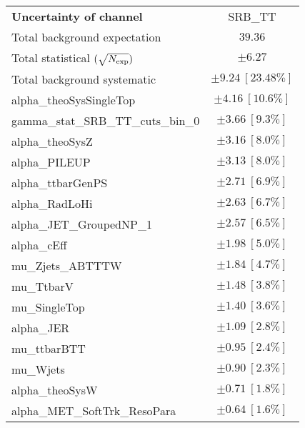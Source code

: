 
\begin{table}
\begin{center}
\setlength{\tabcolsep}{0.0pc}
\begin{tabular*}{\textwidth}{@{\extracolsep{\fill}}lc}
\noalign{\smallskip}\hline\noalign{\smallskip}
{\bf Uncertainty of channel}                                    & SRB\_TT            \\
\noalign{\smallskip}\hline\noalign{\smallskip}
Total background expectation             &  $39.36$       \\
\noalign{\smallskip}\hline\noalign{\smallskip}
Total statistical $(\sqrt{N_{\rm exp}})$              & $\pm 6.27$       \\
Total background systematic               & $\pm 9.24\ [23.48\%] $             \\
\noalign{\smallskip}\hline\noalign{\smallskip}
\noalign{\smallskip}\hline\noalign{\smallskip}
alpha\_theoSysSingleTop         & $\pm 4.16\ [10.6\%] $       \\
gamma\_stat\_SRB\_TT\_cuts\_bin\_0         & $\pm 3.66\ [9.3\%] $       \\
alpha\_theoSysZ         & $\pm 3.16\ [8.0\%] $       \\
alpha\_PILEUP         & $\pm 3.13\ [8.0\%] $       \\
alpha\_ttbarGenPS         & $\pm 2.71\ [6.9\%] $       \\
alpha\_RadLoHi         & $\pm 2.63\ [6.7\%] $       \\
alpha\_JET\_GroupedNP\_1         & $\pm 2.57\ [6.5\%] $       \\
alpha\_cEff         & $\pm 1.98\ [5.0\%] $       \\
mu\_Zjets\_ABTTTW         & $\pm 1.84\ [4.7\%] $       \\
mu\_TtbarV         & $\pm 1.48\ [3.8\%] $       \\
mu\_SingleTop         & $\pm 1.40\ [3.6\%] $       \\
alpha\_JER         & $\pm 1.09\ [2.8\%] $       \\
mu\_ttbarBTT         & $\pm 0.95\ [2.4\%] $       \\
mu\_Wjets         & $\pm 0.90\ [2.3\%] $       \\
alpha\_theoSysW         & $\pm 0.71\ [1.8\%] $       \\
alpha\_MET\_SoftTrk\_ResoPara         & $\pm 0.64\ [1.6\%] $       \\

\end{tabular*}
\end{center}
\end{table}
